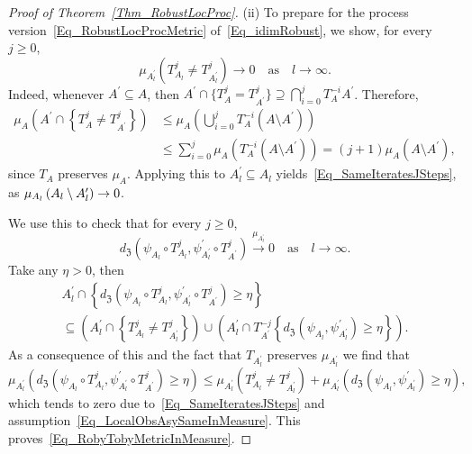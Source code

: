 \documentclass[10pt]{amsart}
\theoremstyle{definition}\newtheorem{defi}[theo]{Definition}\newtheorem{rema}[theo]{Remark}\newtheorem{exam}[theo]{Example}\newtheorem{exem}[theo]{Example}\newtheorem{nota}[theo]{Notation}
\newcommand{\frkZ}{\mathfrak{Z}}
\begin{document}
\begin{proof}[{Proof of Theorem~\ref{Thm_RobustLocProc}}]
\vspace{6pt}
\noindent (ii) To prepare for the process version~\eqref{Eq_RobustLocProcMetric} of~\eqref{Eq_idimRobust}, we show, for every $j\geq0$,
\begin{equation}\label{Eq_SameIteratesJSteps}
\mu_{A_{l}^{\prime}}\left(T_{A_{l}}^{j}\neq T_{A_{l}^{\prime}}^{j}\right)\longrightarrow 0\quad\text{as}\quad l\rightarrow\infty. 
\end{equation}
Indeed, whenever $A^{\prime}\subseteq A$, then $A^{\prime}\cap\{T_{A} ^{j}=T_{A^{\prime}}^{j}\}\supseteq {\textstyle\bigcap\nolimits_{i=0}^{j}} T_{A}^{-i}A^{\prime}$. Therefore,
\begin{align*}
\mu_{A}\left(A^{\prime}\cap\left\{T_{A}^{j}\neq T_{A^{\prime}}^{j}\right\}\right) & \leq\mu _{A}\left({\textstyle\bigcup\nolimits_{i=0}^{j}} T_{A}^{-i}\left(A\setminus A^{\prime}\right)\right) \\
& \leq {\textstyle\sum\limits_{i=0}^{j}}
\mu_{A}\left(T_{A}^{-i}\left(A\setminus A^{\prime}\right)\right) =(j+1)\mu_{A}\left(A\setminus A^{\prime}\right),
\end{align*}
since $T_{A}$ preserves $\mu_{A}$. Applying this to $A_{l}^{\prime}\subseteq A_{l}$ yields~\eqref{Eq_SameIteratesJSteps}, as $\mu_{A_{l}}\left(A_{l}\setminus A_{l}^{\prime}\right)\linebreak \rightarrow0$.

We use this to check that for every $j\geq0$,
\begin{equation}\label{Eq_RobyTobyMetricInMeasure}
d_{\frkZ}\left(\psi_{A_{l}}\circ T_{A_{l}}^{j},\psi_{A_{l}^{\prime}} ^{\prime}\circ T_{A^{\prime}}^{j}\right)\overset{\mu_{A_{l}^{\prime}}} {\longrightarrow}0\quad\text{as}\quad l\rightarrow\infty.
\end{equation}
Take any $\eta>0$, then
\begin{multline*}
A_{l}^{\prime}\cap\left\{d_{\frkZ}\left(\psi_{A_{l} }\circ T_{A_{l}}^{j},\psi_{A_{l}^{\prime}}^{\prime}\circ T_{A^{\prime}} ^{j}\right)\geq\eta\right\}\\
\subseteq\left(A_{l}^{\prime}\cap\left\{T_{A_{l}}^{j}\neq T_{A_{l} ^{\prime}}^{j}\right\}\right)\cup\left(A_{l}^{\prime}\cap T_{A^{\prime}}^{-j}\left\{d_{\frkZ }\left(\psi_{A_{l}},\psi_{A_{l}^{\prime}}^{\prime}\right)\geq\eta\right\}\right).
\end{multline*}
As a consequence of this and the fact that $T_{A_{l}^{\prime}}$ preserves $\mu_{A_{l}^{\prime} }$ we find that
\[
\mu_{A_{l}^{\prime}}\left(d_{\frkZ}\left(\psi_{A_{l}}\circ T_{A_{l}}^{j},\psi_{A_{l}^{\prime}}^{\prime}\circ T_{A^{\prime}}^{j}\right)\geq\eta\right)\leq
\mu_{A_{l}^{\prime}}\left(T_{A_{l}}^{j}\neq T_{A_{l}^{\prime}}^{j}\right)+\mu _{A_{l}^{\prime}}\left(d_{\frkZ}\left(\psi_{A_{l}},\psi_{A_{l}^{\prime}}^{\prime}\right)\geq\eta\right),
\]
which tends to zero due to~\eqref{Eq_SameIteratesJSteps} and assumption~\eqref{Eq_LocalObsAsySameInMeasure}. This proves~\eqref{Eq_RobyTobyMetricInMeasure}.
 

\end{proof}
\end{document}
